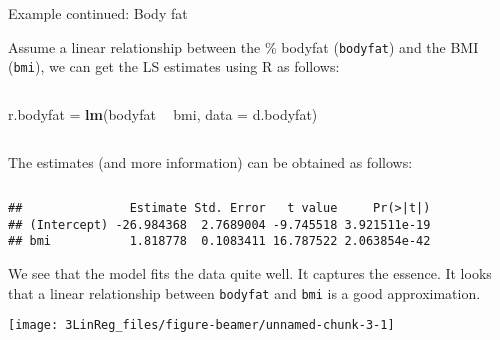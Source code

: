 \documentclass[10pt,ignorenonframetext,]{beamer}
\newenvironment{Shaded}{\begin{snugshade}}{\end{snugshade}}
\newcommand{\DataTypeTok}[1]{\textcolor[rgb]{0.13,0.29,0.53}{#1}}
\newcommand{\KeywordTok}[1]{\textcolor[rgb]{0.13,0.29,0.53}{\textbf{#1}}}
\newcommand{\NormalTok}[1]{#1}
\newcommand{\OperatorTok}[1]{\textcolor[rgb]{0.81,0.36,0.00}{\textbf{#1}}}
\newcommand{\StringTok}[1]{\textcolor[rgb]{0.31,0.60,0.02}{#1}}
\begin{document}
\begin{frame}[fragile]

\begin{block}{Example continued: Body fat}

\vspace{2mm}

Assume a linear relationship between the \% bodyfat (\texttt{bodyfat})
and the BMI (\texttt{bmi}), we can get the LS estimates using R as
follows:

\(~\)

\scriptsize

\begin{Shaded}
\begin{Highlighting}[]
\NormalTok{r.bodyfat =}\StringTok{ }\KeywordTok{lm}\NormalTok{(bodyfat }\OperatorTok{~}\StringTok{ }\NormalTok{bmi, }\DataTypeTok{data =}\NormalTok{ d.bodyfat)}
\end{Highlighting}
\end{Shaded}

\(~\)

\normalsize

The estimates (and more information) can be obtained as follows:

\(~\)

\scriptsize

\begin{Shaded}
\end{Shaded}

\begin{verbatim}
##               Estimate Std. Error   t value     Pr(>|t|)
## (Intercept) -26.984368  2.7689004 -9.745518 3.921511e-19
## bmi           1.818778  0.1083411 16.787522 2.063854e-42
\end{verbatim}

\end{block}

\end{frame}

\begin{frame}[fragile]

We see that the model fits the data quite well. It captures the essence.
It looks that a linear relationship between \texttt{bodyfat} and
\texttt{bmi} is a good approximation.

\begin{center}\texttt{[image: 3LinReg\_files/figure-beamer/unnamed-chunk-3-1]} \end{center}

\end{frame}
\end{document}
